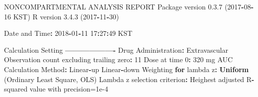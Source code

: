 \documentclass[12pt,]{krantz}
\newenvironment{Shaded}{\begin{snugshade}}{\end{snugshade}}
\newcommand{\KeywordTok}[1]{\textcolor[rgb]{0.13,0.29,0.53}{\textbf{#1}}}
\newcommand{\DecValTok}[1]{\textcolor[rgb]{0.00,0.00,0.81}{#1}}
\newcommand{\FloatTok}[1]{\textcolor[rgb]{0.00,0.00,0.81}{#1}}
\newcommand{\StringTok}[1]{\textcolor[rgb]{0.31,0.60,0.02}{#1}}
\newcommand{\ControlFlowTok}[1]{\textcolor[rgb]{0.13,0.29,0.53}{\textbf{#1}}}
\newcommand{\OperatorTok}[1]{\textcolor[rgb]{0.81,0.36,0.00}{\textbf{#1}}}
\newcommand{\NormalTok}[1]{#1}
\theoremstyle{definition}
\theoremstyle{definition}
\theoremstyle{definition}
\theoremstyle{remark}
\begin{document}
\begin{Shaded}
\begin{Highlighting}[]
\NormalTok{                        NONCOMPARTMENTAL ANALYSIS REPORT}
\NormalTok{                       Package version }\FloatTok{0.3}\NormalTok{.}\DecValTok{7}\NormalTok{ (}\DecValTok{2017}\OperatorTok{-}\DecValTok{08}\OperatorTok{-}\DecValTok{16}\NormalTok{ KST)}
\NormalTok{                          R version }\FloatTok{3.4}\NormalTok{.}\DecValTok{3}\NormalTok{ (}\DecValTok{2017}\OperatorTok{-}\DecValTok{11}\OperatorTok{-}\DecValTok{30}\NormalTok{)}

\NormalTok{Date and Time}\OperatorTok{:}\StringTok{ }\DecValTok{2018}\OperatorTok{-}\DecValTok{01}\OperatorTok{-}\DecValTok{11} \DecValTok{17}\OperatorTok{:}\DecValTok{27}\OperatorTok{:}\DecValTok{49}\NormalTok{ KST}

\NormalTok{Calculation Setting}
\OperatorTok{-------------------}
\NormalTok{Drug Administration}\OperatorTok{:}\StringTok{ }\NormalTok{Extravascular}
\NormalTok{Observation count excluding trailing zero}\OperatorTok{:}\StringTok{ }\DecValTok{11}
\NormalTok{Dose at time }\DecValTok{0}\OperatorTok{:}\StringTok{ }\DecValTok{320}\NormalTok{ mg}
\NormalTok{AUC Calculation Method}\OperatorTok{:}\StringTok{ }\NormalTok{Linear}\OperatorTok{-}\NormalTok{up Linear}\OperatorTok{-}\NormalTok{down}
\NormalTok{Weighting }\ControlFlowTok{for}\NormalTok{ lambda z}\OperatorTok{:}\StringTok{ }\KeywordTok{Uniform}\NormalTok{ (Ordinary Least Square, OLS)}
\NormalTok{Lambda z selection criterion}\OperatorTok{:}\StringTok{ }\NormalTok{Heighest adjusted R}\OperatorTok{-}\NormalTok{squared value with precision=}\FloatTok{1e-4}



\end{Highlighting}
\end{Shaded}
\end{document}
